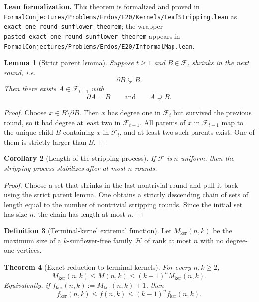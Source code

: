 \documentclass[11pt]{article}
\newtheorem{theorem}{Theorem}[section]
\newtheorem{lemma}[theorem]{Lemma}
\newtheorem{corollary}[theorem]{Corollary}
\theoremstyle{definition}
\newtheorem{definition}[theorem]{Definition}
\newcommand{\Hh}{\mathcal{H}}
\newcommand{\1}{\mathbf{1}}
\newcommand{\leannote}[1]{\par\smallskip\noindent\textbf{Lean formalization.} #1\par\smallskip}
\begin{document}
\leannote{This theorem is formalized and proved in \texttt{FormalConjectures/Problems/Erdos/E20/Kernels/LeafStripping.lean} as \texttt{exact\_one\_round\_sunflower\_theorem}; the wrapper \texttt{pasted\_exact\_one\_round\_sunflower\_theorem} appears in \texttt{FormalConjectures/Problems/Erdos/E20/InformalMap.lean}.}

\begin{lemma}[Strict parent lemma]
Suppose $t\ge 1$ and $B\in \mathcal F_t$ shrinks in the next round, i.e.
\[
\partial B\subsetneq B.
\]
Then there exists $A\in \mathcal F_{t-1}$ with
\[
\partial A=B
\qquad\text{and}\qquad
A\supsetneq B.
\]
\end{lemma}

\begin{proof}
Choose $x\in B\setminus \partial B$. Then $x$ has degree one in $\mathcal F_t$ but survived the previous round, so it had degree at least two in $\mathcal F_{t-1}$. All parents of $x$ in $\mathcal F_{t-1}$ map to the unique child $B$ containing $x$ in $\mathcal F_t$, and at least two such parents exist. One of them is strictly larger than $B$.
\end{proof}

\begin{corollary}[Length of the stripping process]
If $\mathcal F$ is $n$-uniform, then the stripping process stabilizes after at most $n$ rounds.
\end{corollary}

\begin{proof}
Choose a set that shrinks in the last nontrivial round and pull it back using the strict parent lemma. One obtains a strictly descending chain of sets of length equal to the number of nontrivial stripping rounds. Since the initial set has size $n$, the chain has length at most $n$.
\end{proof}

\begin{definition}[Terminal-kernel extremal function]
Let $M_{\ker}(n,k)$ be the maximum size of a $k$-sunflower-free family $\Hh$ of rank at most $n$ with no degree-one vertices.
\end{definition}

\begin{theorem}[Exact reduction to terminal kernels]\label{thm:exact-reduction}
For every $n,k\ge 2$,
\[
M_{\ker}(n,k)\le M(n,k)\le (k-1)^n M_{\ker}(n,k).
\]
Equivalently, if $f_{\ker}(n,k):=M_{\ker}(n,k)+1$, then
\[
f_{\ker}(n,k)\le f(n,k)\le (k-1)^n f_{\ker}(n,k).
\]
\end{theorem}
\end{document}
